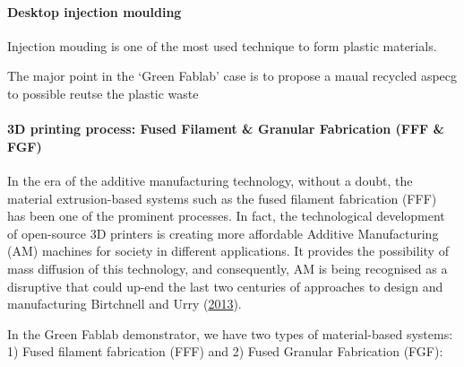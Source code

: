 \documentclass[
  11pt,
]{article}
\let\oldparagraph\paragraph
\renewcommand{\paragraph}[1]{\oldparagraph{#1}\mbox{}}
\let\paragraph\oldparagraph
\begin{document}
\hypertarget{desktop-injection-moulding}{%
\paragraph{Desktop injection
moulding}\label{desktop-injection-moulding}}

Injection mouding is one of the most used technique to form plastic
materials.

The major point in the `Green Fablab' case is to propose a maual
recycled aspecg to possible reutse the plastic waste

\hypertarget{d-printing-process-fused-filament-granular-fabrication-fff-fgf}{%
\paragraph{3D printing process: Fused Filament \& Granular Fabrication
(FFF \&
FGF)}\label{d-printing-process-fused-filament-granular-fabrication-fff-fgf}}

In the era of the additive manufacturing technology, without a doubt,
the material extrusion-based systems such as the fused filament
fabrication (FFF) has been one of the prominent processes. In fact, the
technological development of open-source 3D printers is creating more
affordable Additive Manufacturing (AM) machines for society in different
applications. It provides the possibility of mass diffusion of this
technology, and consequently, AM is being recognised as a disruptive
that could up-end the last two centuries of approaches to design and
manufacturing Birtchnell and Urry
(\protect\hyperlink{ref-Birtchnell2013a}{2013}).

In the Green Fablab demonstrator, we have two types of material-based
systems: 1) Fused filament fabrication (FFF) and 2) Fused Granular
Fabrication (FGF):
\end{document}
